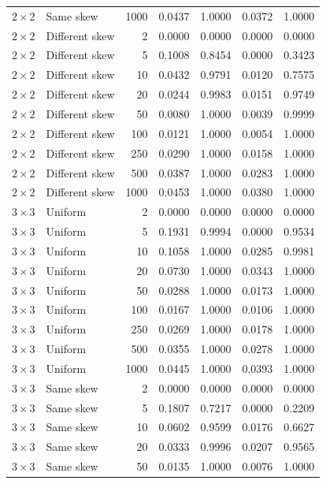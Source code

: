 \begin{longtable}{@{}llrrrrr@{}}
\(2\times2\) & Same skew & 1000 & 0.0437 & 1.0000 & 0.0372 & 1.0000 \\
\addlinespace
\(2\times2\) & Different skew & 2 & 0.0000 & 0.0000 & 0.0000 & 0.0000 \\
\(2\times2\) & Different skew & 5 & 0.1008 & 0.8454 & 0.0000 & 0.3423 \\
\(2\times2\) & Different skew & 10 & 0.0432 & 0.9791 & 0.0120 & 0.7575 \\
\(2\times2\) & Different skew & 20 & 0.0244 & 0.9983 & 0.0151 & 0.9749 \\
\(2\times2\) & Different skew & 50 & 0.0080 & 1.0000 & 0.0039 & 0.9999 \\
\(2\times2\) & Different skew & 100 & 0.0121 & 1.0000 & 0.0054 & 1.0000 \\
\(2\times2\) & Different skew & 250 & 0.0290 & 1.0000 & 0.0158 & 1.0000 \\
\(2\times2\) & Different skew & 500 & 0.0387 & 1.0000 & 0.0283 & 1.0000 \\
\(2\times2\) & Different skew & 1000 & 0.0453 & 1.0000 & 0.0380 & 1.0000 \\
\addlinespace
\(3\times3\) & Uniform & 2 & 0.0000 & 0.0000 & 0.0000 & 0.0000 \\
\(3\times3\) & Uniform & 5 & 0.1931 & 0.9994 & 0.0000 & 0.9534 \\
\(3\times3\) & Uniform & 10 & 0.1058 & 1.0000 & 0.0285 & 0.9981 \\
\(3\times3\) & Uniform & 20 & 0.0730 & 1.0000 & 0.0343 & 1.0000 \\
\(3\times3\) & Uniform & 50 & 0.0288 & 1.0000 & 0.0173 & 1.0000 \\
\(3\times3\) & Uniform & 100 & 0.0167 & 1.0000 & 0.0106 & 1.0000 \\
\(3\times3\) & Uniform & 250 & 0.0269 & 1.0000 & 0.0178 & 1.0000 \\
\(3\times3\) & Uniform & 500 & 0.0355 & 1.0000 & 0.0278 & 1.0000 \\
\(3\times3\) & Uniform & 1000 & 0.0445 & 1.0000 & 0.0393 & 1.0000 \\
\addlinespace
\(3\times3\) & Same skew & 2 & 0.0000 & 0.0000 & 0.0000 & 0.0000 \\
\(3\times3\) & Same skew & 5 & 0.1807 & 0.7217 & 0.0000 & 0.2209 \\
\(3\times3\) & Same skew & 10 & 0.0602 & 0.9599 & 0.0176 & 0.6627 \\
\(3\times3\) & Same skew & 20 & 0.0333 & 0.9996 & 0.0207 & 0.9565 \\
\(3\times3\) & Same skew & 50 & 0.0135 & 1.0000 & 0.0076 & 1.0000 \\

\end{longtable}

